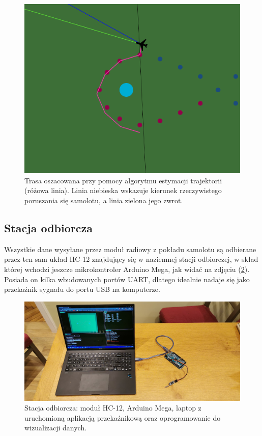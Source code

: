 \documentclass[12pt, a4paper]{article}
\let\oldref\ref
\renewcommand{\ref}[1]{(\oldref{#1})}
\begin{document}
\begin{figure}[ht]
    \centering
    \includegraphics[width=1\textwidth]{estymacja}
    \caption{Trasa oszacowana przy pomocy algorytmu estymacji trajektorii (różowa linia). Linia niebieska wskazuje kierunek rzeczywistego poruszania się samolotu, a linia zielona jego zwrot.}
    \label{fig:estymacja}
\end{figure}

 \FloatBarrier
\subsection{Stacja odbiorcza}
Wszystkie dane wysyłane przez moduł radiowy z pokładu samolotu są odbierane przez ten sam układ HC-12 znajdujący się w naziemnej stacji odbiorczej, w skład której wchodzi jeszcze mikrokontroler Arduino Mega, jak widać na zdjęciu \ref{fig:baza}. Posiada on kilka wbudowanych portów UART, dlatego idealnie nadaje się jako przekaźnik sygnału do portu USB na komputerze.

 \begin{figure}[ht]
    \centering
    \includegraphics[width=1\textwidth]{baza}
    \caption{Stacja odbiorcza: moduł HC-12, Arduino Mega, laptop z uruchomioną aplikacją przekaźnikową oraz oprogramowanie do wizualizacji danych.}
    \label{fig:baza}
\end{figure}
\end{document}
